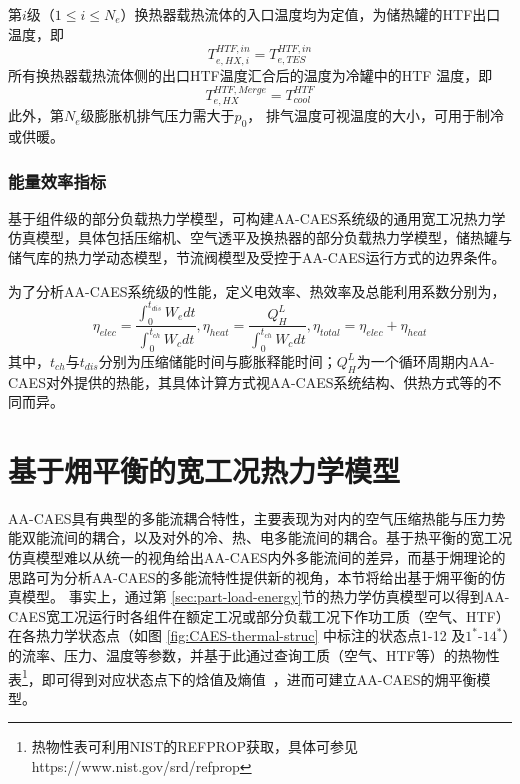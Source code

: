 第$i$级（$1\le i\le N_e$）换热器载热流体的入口温度均为定值，为储热罐的HTF出口温度，即
\begin{equation}
T_{e,HX,i}^{HTF,in} = {T_{e,TES}^{HTF,in}}
\end{equation}
所有换热器载热流体侧的出口HTF温度汇合后的温度为冷罐中的HTF 温度，即
\begin{equation}
T_{e,HX}^{HTF,Merge} = T_{cool}^{HTF}
\end{equation}
此外，第$N_e$级膨胀机排气压力需大于$p_0$， 排气温度可视温度的大小，可用于制冷或供暖。

\subsubsection{能量效率指标}
\label{sec:part-load-energy-full}
基于组件级的部分负载热力学模型，可构建AA-CAES系统级的通用宽工况热力学仿真模型，具体包括压缩机、空气透平及换热器的部分负载热力学模型，储热罐与储气库的热力学动态模型，节流阀模型及受控于AA-CAES运行方式的边界条件。

为了分析AA-CAES系统级的性能，定义电效率、热效率及总能利用系数分别为，
\begin{equation}
{\eta _{elec}} = \frac{{\int_0^{{t_{dis}}} {{W_e}dt}}}{{{\int_0^{{t_{ch}}} {{W_c}dt}}}}, {\eta _{heat}} = \frac{{Q_H^L}}{{{\int_0^{{t_{ch}}} {{W_c}dt}}}}, {\eta _{total}} = {\eta _{elec}} + {\eta _{heat}}
\end{equation}
其中，$t_{ch}$与$t_{dis}$分别为压缩储能时间与膨胀释能时间；$Q_{H}^{L}$为一个循环周期内AA-CAES对外提供的热能，其具体计算方式视AA-CAES系统结构、供热方式等的不同而异。%

\section{基于㶲平衡的宽工况热力学模型}
\label{sec:chap2-part-load-exergy}
AA-CAES具有典型的多能流耦合特性，主要表现为对内的空气压缩热能与压力势能双能流间的耦合，以及对外的冷、热、电多能流间的耦合。基于热平衡的宽工况仿真模型难以从统一的视角给出AA-CAES内外多能流间的差异，而基于㶲理论的思路可为分析AA-CAES的多能流特性提供新的视角，本节将给出基于㶲平衡的仿真模型。 事实上，通过第
\ref{sec:part-load-energy}节的热力学仿真模型可以得到AA-CAES宽工况运行时各组件在额定工况或部分负载工况下作功工质（空气、HTF）在各热力学状态点（如图
\ref{fig:CAES-thermal-struc} 中标注的状态点1-12 及$1^*$-$14^*$）的流率、压力、温度等参数，并基于此通过查询工质（空气、HTF等）的热物性表\footnote{热物性表可利用NIST的REFPROP获取，具体可参见https://www.nist.gov/srd/refprop}，即可得到对应状态点下的焓值及熵值~\cite{Eng-Thermo-83}，进而可建立AA-CAES的㶲平衡模型。

